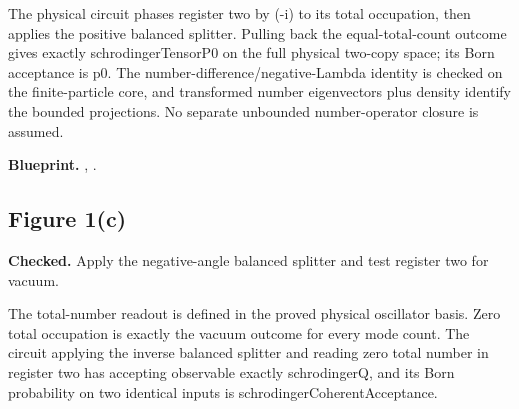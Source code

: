 The physical circuit phases register two by (-i) to its total occupation, then applies the positive balanced splitter. Pulling back the equal-total-count outcome gives exactly schrodingerTensorP0 on the full physical two-copy space; its Born acceptance is p0. The number-difference/negative-Lambda identity is checked on the finite-particle core, and transformed number eigenvectors plus density identify the bounded projections. No separate unbounded number-operator closure is assumed.


\textbf{Blueprint.} , .

\subsection{Figure 1(c)}\label{paper:f1c}
\textbf{Checked.} Apply the negative-angle balanced splitter and test register two for vacuum. 

The total-number readout is defined in the proved physical oscillator basis. Zero total occupation is exactly the vacuum outcome for every mode count. The circuit applying the inverse balanced splitter and reading zero total number in register two has accepting observable exactly schrodingerQ, and its Born probability on two identical inputs is schrodingerCoherentAcceptance.

